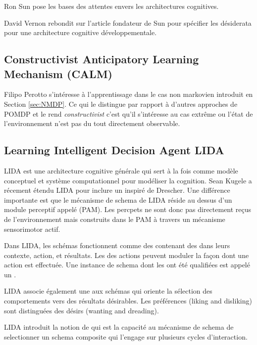 Ron Sun \cite{sun_desiderata_2004} pose les bases des attentes envers les architectures cognitives.

David Vernon \cite{vernon_desiderata_2016} rebondit sur l'article fondateur de Sun pour spécifier les désiderata pour une architecture cognitive développementale. 

\subsection{Constructivist Anticipatory Learning Mechanism (CALM)}

Filipo Perotto \cite{perotto_computational_2013} s'intéresse à l'apprentissage  dans le cas non markovien introduit en Section \ref{sec:NMDP}.
Ce qui le distingue par rapport à d'autres approches de POMDP et le rend \emph{constructivist} c'est qu'il s'intéresse au cas extrême ou l'état de l'environnement n'est pas du tout directement observable.



\subsection{Learning Intelligent Decision Agent  LIDA}
\label{sec:lida}

LIDA est une architecture cognitive générale qui sert à la fois comme modèle conceptuel et système computationnel pour modéliser la cognition. 
Sean Kugele \cite{kugele_constructivist_2025} a récement étendu LIDA pour inclure un  inspiré de Drescher. 
Une différence importante est que le mécanisme de schema de LIDA réside au dessus d'un module perceptif appelé  (PAM).
Les \og percpets \fg ne sont donc pas directement reçus de l'environnement mais construits dans le PAM à travers un mécanisme sensorimotor actif. 

Dans LIDA, les schémas fonctionnent comme des  contenant des  dans leurs contexte, action, et résultats. 
Les  des actions peuvent moduler la façon dont une action est effectuée. 
Une instance de schema dont les  ont été qualifiées est appelé un .

LIDA associe également une  aux schémas qui oriente la sélection des comportements vers des résultats désirables.
Les préférences (liking and disliking) sont distinguées des désirs (wanting and dreading).

LIDA introduit la notion de  qui est la capacité au mécanisme de schema de selectionner un schema composite qui l'engage sur plusieurs cycles d'interaction. 

